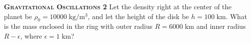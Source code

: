 \begin{problem}
\textbf{\textsc{Gravitational Oscillations 2}} Let the density right at the center of the planet be \(\rho_0=10000 \; \mathrm{kg/m^3}\), and let the height of the disk be $h = 100 \; \mathrm{km}$. What is the mass enclosed in the ring with outer radius \(R = 6000 \; \mathrm{km}\) and inner radius \(R - \epsilon\), where $\epsilon=1 \; \mathrm{km}$?
    
\end{problem}
